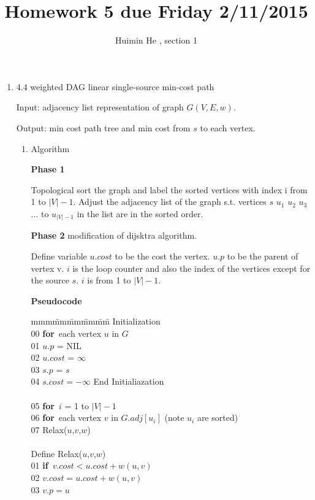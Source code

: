 \documentclass[11pt]{article}
\title{Homework 5 due Friday 2/11/2015}
\author{Huimin He , section 1}
\begin{document}
\maketitle
\def\bfor{\textbf{for}}
\def\bdo{\textbf{do}}
\def\bwhile{\textbf{while}}
\def\bend{\textbf{end}}
\def\bif{\textbf{if}}
\def\bthen{\textbf{then}}
\def\belse{\textbf{else}}
\def\breturn{\textbf{return}}
\def\bexit{\textbf{exit}}
\def\bprint{\textbf{print}}
\begin{enumerate}
\item 4.4 weighted DAG linear single-source min-cost path

Input: adjacency list representation of graph $G(V,E,w)$.

Output: min cost path tree and min cost from $s$ to each vertex. 
\begin{enumerate}
\item Algorithm

\textbf{Phase 1}

Topological sort the graph and label the sorted vertices with index i from 1 to $|V|-1$. Adjust the adjacency list of the graph s.t. vertices $s$ $u_1$ $u_2$ $u_3$ ... to $u_{|V|-1}$ in the list  are in the sorted order.

\textbf{Phase 2} modification of dijsktra algorithm.

Define variable $u.cost$ to be the cost the vertex. $u.p$ to be the parent of vertex v. $i$ is the loop counter and also the index of the vertices except for the source $s$. $i$ is from 1 to $|V|-1$.

\textbf{Pseudocode}
\begin{tabbing}
mmm\= mm\= mm\= mm\= mm\= \kill
Initialization\\
00 \> \bfor\ each vertex $u$ in $G$ \\
01 \> \> $u.p$ = NIL \\
02 \> \> $u.cost$ = $\infty$ \\
03 \> $s.p$ = $s$ \\
04 \> $s.cost = -\infty$
End Initialiazation\\
\\
05 \> \bfor\ $i$ = 1 to $|V|-1$\\
06 \> \> \bfor\ each vertex $v$ in $G.adj[u_i]$ (note $u_i$ are sorted) \\
07 \> \> \> Relax($u$,$v$,$w$) \\
\\
Define Relax($u$,$v$,$w$) \\
01 \> \bif\ $v.cost < u.cost + w(u,v)$ \\
02 \> \> $v.cost = u.cost + w(u,v)$\\
03 \> \> $v.p = u$\\


\end{tabbing}
\end{enumerate}
\end{enumerate}
\end{document}
